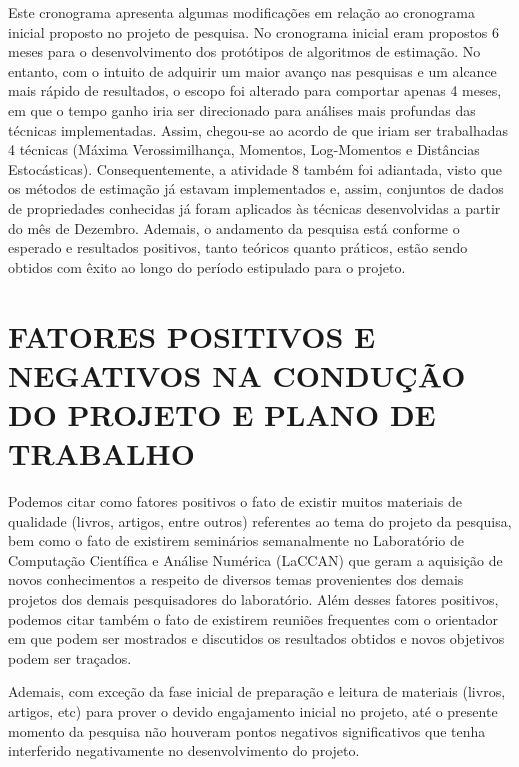 \documentclass[12pt]{article}
\begin{document}
Este cronograma apresenta algumas modificações em relação ao cronograma inicial proposto no projeto de pesquisa. No cronograma inicial eram propostos 6 meses para o desenvolvimento dos protótipos de algoritmos de estimação. No entanto, com o intuito de adquirir um maior avanço nas pesquisas e um alcance mais rápido de resultados, o escopo foi alterado para comportar apenas 4 meses, em que o tempo ganho iria ser direcionado para análises mais profundas das técnicas implementadas. Assim, chegou-se ao acordo de que iriam ser trabalhadas 4 técnicas (Máxima Verossimilhança, Momentos, Log-Momentos e Distâncias Estocásticas). Consequentemente, a atividade 8 também foi adiantada, visto que os métodos de estimação já estavam implementados e, assim, conjuntos de dados de propriedades conhecidas já foram aplicados às técnicas desenvolvidas a partir do mês de Dezembro. Ademais, o andamento da pesquisa está conforme o esperado e resultados positivos, tanto teóricos quanto práticos, estão sendo obtidos com êxito ao longo do período estipulado para o projeto. 


\newpage
\section*{\centering \textbf{FATORES POSITIVOS E NEGATIVOS NA CONDUÇÃO DO PROJETO E PLANO DE TRABALHO}}

\vspace{0.5cm}

Podemos citar como fatores positivos o fato de existir muitos materiais de qualidade (livros, artigos, entre outros) referentes ao tema do projeto da pesquisa, bem como o fato de existirem seminários semanalmente no Laboratório de Computação Científica e Análise Numérica (LaCCAN) que geram a aquisição de novos conhecimentos a respeito de diversos temas provenientes dos demais projetos dos demais pesquisadores do laboratório. Além desses fatores positivos, podemos citar também o fato de existirem reuniões frequentes com o orientador em que podem ser mostrados e discutidos os resultados obtidos e novos objetivos podem ser traçados. 

Ademais, com exceção da fase inicial de preparação e leitura de materiais (livros, artigos, etc) para prover o devido engajamento inicial no projeto, até o presente momento da pesquisa não houveram pontos negativos significativos que tenha interferido negativamente no desenvolvimento do projeto. 



\newpage



%
\end{document}

